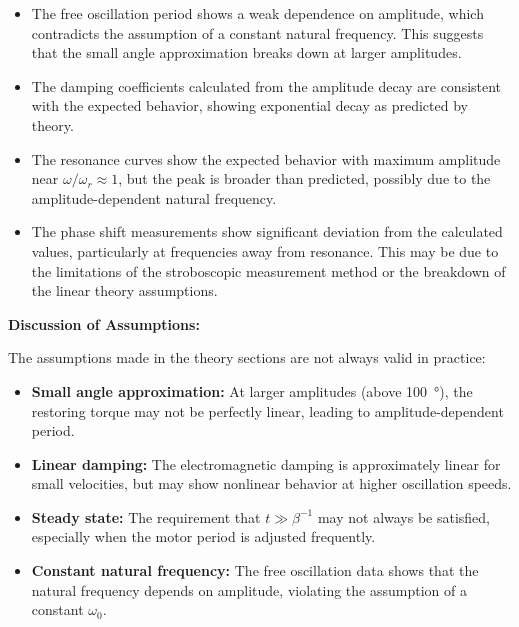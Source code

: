 \documentclass[12pt]{article}
\begin{document}
\begin{itemize}[leftmargin=*]
\item The free oscillation period shows a weak dependence on amplitude, which contradicts the assumption of a constant natural frequency. This suggests that the small angle approximation breaks down at larger amplitudes.

\item The damping coefficients calculated from the amplitude decay are consistent with the expected behavior, showing exponential decay as predicted by theory.

\item The resonance curves show the expected behavior with maximum amplitude near $\omega/\omega_r \approx 1$, but the peak is broader than predicted, possibly due to the amplitude-dependent natural frequency.

\item The phase shift measurements show significant deviation from the calculated values, particularly at frequencies away from resonance. This may be due to the limitations of the stroboscopic measurement method or the breakdown of the linear theory assumptions.
\end{itemize}

\textbf{Discussion of Assumptions:}

The assumptions made in the theory sections are not always valid in practice:

\begin{itemize}[leftmargin=*]
\item \textbf{Small angle approximation:} At larger amplitudes (above \SI{100}{\degree}), the restoring torque may not be perfectly linear, leading to amplitude-dependent period.

\item \textbf{Linear damping:} The electromagnetic damping is approximately linear for small velocities, but may show nonlinear behavior at higher oscillation speeds.

\item \textbf{Steady state:} The requirement that $t \gg \beta^{-1}$ may not always be satisfied, especially when the motor period is adjusted frequently.

\item \textbf{Constant natural frequency:} The free oscillation data shows that the natural frequency depends on amplitude, violating the assumption of a constant $\omega_0$.
\end{itemize}
\end{document}
